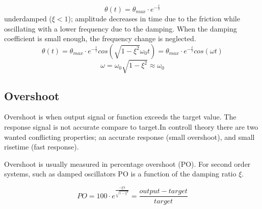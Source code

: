\documentclass[\main/master.tex]{subfiles}
\begin{document}
\begin{equation}
\theta(t) = \theta_{max}\cdot e^{-\frac{t}{\tau}}     \label{eqn:underdamped_motion_equation}
\end{equation}
 underdamped ($\xi < 1$); amplitude decreases in time due to the friction while oscillating with a lower frequency due to the damping. When the damping coefficient is small enough, the frequency change is neglected.
\begin{equation}
\theta(t) = \theta_{max}\cdot e^{-\frac{t}{\tau}}cos(\sqrt{1-\xi^2}\omega_0 t ) =  \theta_{max}\cdot e^{-\frac{t}{\tau}}cos(\omega t )    \label{eqn:underdamped_motion_equation}
\end{equation}
\begin{equation}
\omega = \omega_0\sqrt{1-\xi^2}\approx\omega_0    \label{eqn:underdamped_frequency}
\end{equation}

\subsection{Overshoot}
Overshoot is when output signal or function exceeds the target value. The response signal is not accurate compare to target.In controll theory there are two wanted conflicting properties; an accurate response (small overshoot), and small risetime (fast response). 
\par
Overshoot is usually measured in percentage overshoot (PO). For second order systems, such as damped oscillators PO is a function of the damping ratio $\xi$. 


\begin{equation}
PO = 100\cdot e ^{\frac{-\xi\pi}{\sqrt{1-\xi^2}}} = \frac{output-target}{target}   \label{eqn:percentage_overshoot}
\end{equation}
 



\iffalse
https://ocw.mit.edu/courses/mathematics/18-03sc-differential-equations-fall-2011/unit-ii-second-order-constant-coefficient-linear-equations/damped-harmonic-oscillators/MIT18_03SCF11_s13_2text.pdf

https://www.sciencedirect.com/topics/engineering/underdamped-system#:~:text=When%


\subsection{Driven Oscillator}
If the damped oscillator system is further affected by an external time-dependent tourqe $\tau(t)$,  the system is called driven oscillator.
\begin{equation}
\tau(t) -\kappa\cdot\theta - b\dot{\theta}  = I\cdot\ddot{\theta}   \label{eqn:driven_motion_equation}
\end{equation} 
\begin{equation}
\ddot{\theta} + 2\xi\omega_0\dot{\theta} + \omega_0^2\theta = \frac{\tau(t)}{I}   \label{eqn:damped_motion_equation}
\end{equation}
\fi
\end{document}
